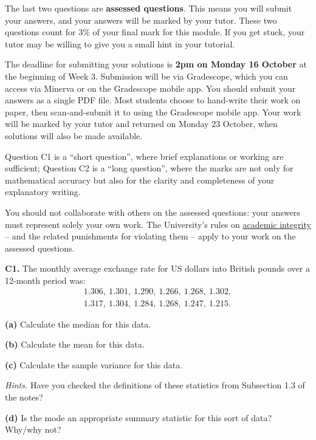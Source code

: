\documentclass[
  a4paper,
]{book}
\theoremstyle{definition}
\theoremstyle{definition}
\theoremstyle{definition}
\theoremstyle{definition}
\theoremstyle{remark}
\begin{document}
The last two questions are \textbf{assessed questions}. This means you will submit your answers, and your answers will be marked by your tutor. These two questions count for 3\% of your final mark for this module. If you get stuck, your tutor may be willing to give you a small hint in your tutorial.

The deadline for submitting your solutions is \textbf{2pm on Monday 16 October} at the beginning of Week 3. Submission will be via Gradescope, which you can access via Minerva or on the Gradescope mobile app.
You should submit your answers as a single PDF file. Most students choose to hand-write their work on paper, then scan-and-submit it to using the Gradescope mobile app. Your work will be marked by your tutor and returned on Monday 23 October, when solutions will also be made available.

Question C1 is a ``short question'', where brief explanations or working are sufficient; Question C2 is a ``long question'', where the marks are not only for mathematical accuracy but also for the clarity and completeness of your explanatory writing.

You should not collaborate with others on the assessed questions: your answers must represent solely your own work. The University's rules on \href{https://library.leeds.ac.uk/info/1401/academic_skills/46/academic_integrity_and_plagiarism}{academic integrity} -- and the related punishments for violating them -- apply to your work on the assessed questions.

\textbf{C1.} The monthly average exchange rate for US dollars into British pounds over a 12-month period was:
\begin{gather*}
1.306, \ 1.301, \ 1.290, \ 1.266, \ 1.268, \ 1.302,\\
1.317, \ 1.304, \ 1.284, \ 1.268, \ 1.247, \ 1.215.
\end{gather*}

\textbf{(a)} Calculate the median for this data.

\textbf{(b)} Calculate the mean for this data.

\textbf{(c)} Calculate the sample variance for this data.

\begin{myanswers}
\emph{Hints.}
Have you checked the definitions of these statistics from Subsection 1.3 of the notes?

\end{myanswers}

\textbf{(d)} Is the mode an appropriate summary statistic for this sort of data? Why/why not?
\end{document}
